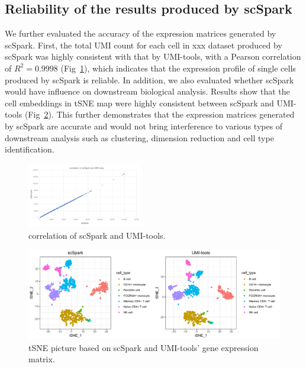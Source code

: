 \documentclass[conference]{IEEEtran}
\begin{document}
\subsection{Reliability of the results produced by scSpark} 
We further evaluated the accuracy of the expression matrices generated by scSpark.
First, the total UMI count for each cell in xxx dataset produced by scSpark was highly consistent with that by UMI-tools, with a Pearson correlation of $R^{2} = 0.9998$ (Fig~\ref{fig9}), which indicates that the expression profile of single cells produced by scSpark is reliable. In addition, we also evaluated whether scSpark would have influence on downstream biological analysis. Results show that the cell embeddings in tSNE map were highly consistent between scSpark and UMI-tools (Fig~\ref{fig10}). This further demonstrates that the expression matrices generated by scSpark are accurate and would not bring interference to various types of downstream analysis such as clustering, dimension reduction and cell type identification.
\begin{figure}
  \includegraphics[width=0.45\textwidth]{fig9.pdf}
  \caption{correlation of scSpark and UMI-tools.} \label{fig9}
\end{figure}
\begin{figure}
  \includegraphics[width=\textwidth]{fig10.pdf}
  \caption{tSNE picture based on scSpark and UMI-tools' gene expression matrix.} \label{fig10}
\end{figure}
\end{document}

